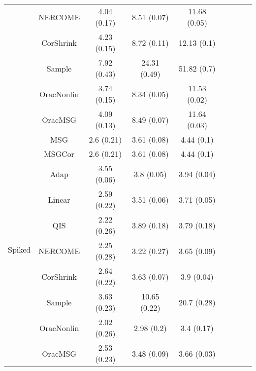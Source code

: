 \documentclass{article}
\begin{document}
\begin{table}[H]
{\begin{tabular}{ccccccccc}
 & NERCOME        & 4.04 (0.17) & 8.51 (0.07)  & 11.68 (0.05) \\
 & CorShrink      & 4.23 (0.15) & 8.72 (0.11)  & 12.13 (0.1)  \\
 & Sample            & 7.92 (0.43) & 24.31 (0.49) & 51.82 (0.7)  \\
 & OracNonlin & 3.74 (0.15) & 8.34 (0.05)  & 11.53 (0.02) \\
 & OracMSG  & 4.09 (0.13) & 8.49 (0.07)  & 11.64 (0.03) \\  \midrule
\multirow{10}{*}{Spiked}  
 & MSG & 2.6 (0.21)  & 3.61 (0.08)  & 4.44 (0.1)  \\
 & MSGCor   & 2.6 (0.21)  & 3.61 (0.08)  & 4.44 (0.1)  \\
 & Adap     & 3.55 (0.06) & 3.8 (0.05)   & 3.94 (0.04) \\
 & Linear         & 2.59 (0.22) & 3.51 (0.06)  & 3.71 (0.05) \\
 & QIS            & 2.22 (0.26) & 3.89 (0.18)   & 3.79 (0.18) \\
 & NERCOME        & 2.25 (0.28) & 3.22 (0.27)  & 3.65 (0.09) \\
 & CorShrink      & 2.64 (0.22) & 3.63 (0.07)  & 3.9 (0.04)  \\
 & Sample            & 3.63 (0.23) & 10.65 (0.22) & 20.7 (0.28) \\
 & OracNonlin & 2.02 (0.26) & 2.98 (0.2)   & 3.4 (0.17)  \\
 & OracMSG  & 2.53 (0.23) & 3.48 (0.09)  & 3.66 (0.03) \\ \bottomrule
\end{tabular}%
}
\end{table}
\end{document}

